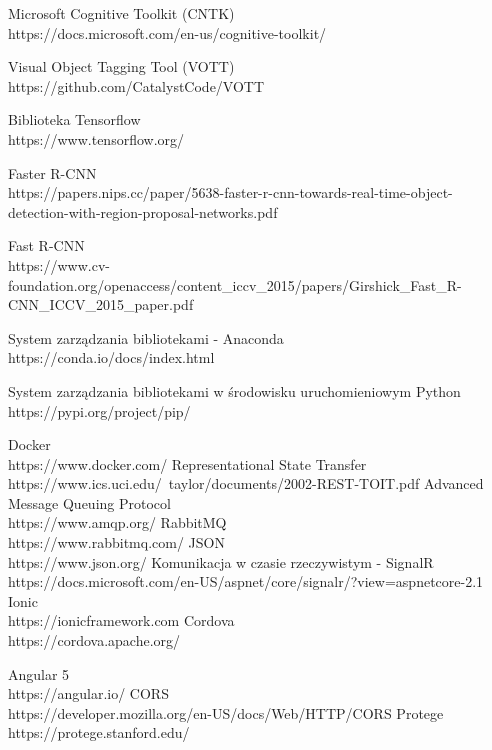 \begin{thebibliography}{1}
 Microsoft Cognitive Toolkit (CNTK)
\\
https://docs.microsoft.com/en-us/cognitive-toolkit/

 Visual Object Tagging Tool (VOTT)
\\
https://github.com/CatalystCode/VOTT

 Biblioteka Tensorflow
\\
https://www.tensorflow.org/

 Faster R-CNN
\\
https://papers.nips.cc/paper/5638-faster-r-cnn-towards-real-time-object-detection-with-region-proposal-networks.pdf

 Fast R-CNN
\\
https://www.cv-foundation.org/openaccess/content\_iccv\_2015/papers/Girshick\_Fast\_R-CNN\_ICCV\_2015\_paper.pdf

 System zarządzania bibliotekami - Anaconda
\\
https://conda.io/docs/index.html

 System zarządzania bibliotekami w środowisku uruchomieniowym Python
\\
https://pypi.org/project/pip/


 Docker
\\
https://www.docker.com/
 Representational State Transfer
\\
https://www.ics.uci.edu/~taylor/documents/2002-REST-TOIT.pdf
Advanced Message Queuing Protocol
\\
https://www.amqp.org/
 RabbitMQ
\\
https://www.rabbitmq.com/
 JSON
\\
https://www.json.org/
 Komunikacja w czasie rzeczywistym - SignalR
\\
https://docs.microsoft.com/en-US/aspnet/core/signalr/?view=aspnetcore-2.1
 Ionic
\\
https://ionicframework.com
 Cordova
\\
https://cordova.apache.org/

 Angular 5
\\
https://angular.io/
CORS
\\
https://developer.mozilla.org/en-US/docs/Web/HTTP/CORS
Protege
\\
https://protege.stanford.edu/


\end{thebibliography}
